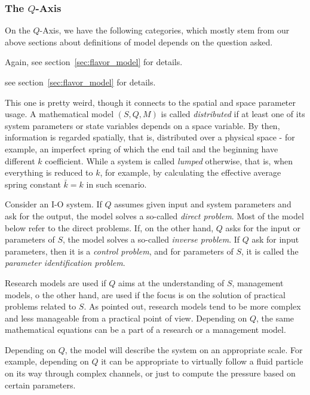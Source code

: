 \subsubsection{The $Q$-Axis}
On the $Q$-Axis, we have the following categories, which mostly stem from our above sections about definitions of model depends on the question asked. 
\begin{description}[leftmargin=2pt,font=\normalfont\itshape\space]
    \item[Phenomenological-Mechanistic] Again, see section~\ref{sec:flavor_model} for details. 
    \item[Stationary-unstationary]  see section~\ref{sec:flavor_model} for details.
    \item[Lumped-distributed] This one is pretty weird, though it connects to the spatial and space parameter usage. A mathematical model $(S,Q,M)$ is called \textit{distributed} if at least one of its system parameters or state variables depends on a space variable. By then, information is regarded spatially, that is, distributed over a physical space - for example, an imperfect spring of which the end tail and the beginning have different $k$ coefficient. While a system is called \textit{lumped} otherwise, that is, when everything is reduced to $k$, for example, by calculating the effective average spring constant $\bar{k}=k$ in such scenario.  
    \item[Direct-inverse] Consider an I-O system. If $Q$ assumes given input and system parameters and ask for the output, the model solves a so-called \textit{direct problem}. Most of the model below refer to the direct problems. If, on the other hand, $Q$ asks for the input or parameters of $S$, the model solves a so-called \textit{inverse problem}. If $Q$ ask for input parameters, then it is a \textit{control problem}, and for parameters of $S$, it is called the \textit{parameter identification problem}.
    \item[Research-management] Research models are used if $Q$ aims at the understanding of $S$, management models, o the other hand, are used if the focus is on the solution of practical problems related to $S$. As pointed out, research models tend to be more complex and less manageable from a practical point of view. Depending on $Q$, the same mathematical equations can be a part of a research or a management model. 
    \item[Scale] Depending on $Q$, the model will describe the system on an appropriate scale. For example, depending on $Q$ it can be appropriate to virtually follow a fluid particle on its way through complex channels, or just to compute the pressure based on certain parameters.   
\end{description}
